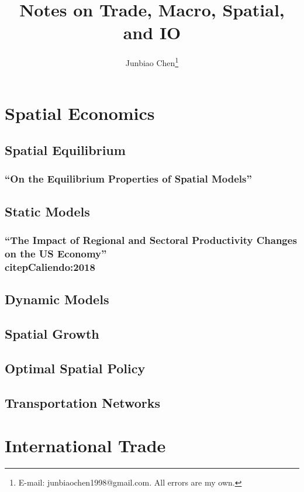 \documentclass[11pt]{report}
\title{Notes on Trade, Macro, Spatial, and IO}
\author{
Junbiao Chen\thanks{E-mail: junbiaochen1998@gmail.com.
All errors are my own.}
}
\date{}
\theoremstyle{definition}
\numberwithin{equation}{section}
\numberwithin{figure}{section}
\numberwithin{table}{section}
\begin{document}
\maketitle

\renewcommand{\thechapter}{\Alph{chapter}}
\setcounter{tocdepth}{2}
\tableofcontents
\etocsettocstyle{}{} %

\chapter{Spatial Economics}
\section{Spatial Equilibrium}
\subsection{``On the Equilibrium Properties of Spatial Models'' \\ \citep{Allen:2024}}  

\clearpage
\section{Static Models}
\subsection{``The Impact of Regional and Sectoral Productivity Changes on the US Economy'' \\ citep{Caliendo:2018}}
\clearpage
\section{Dynamic Models}

\section{Spatial Growth}
\section{Optimal Spatial Policy}
\section{Transportation Networks}

\chapter{International Trade}
\end{document}
